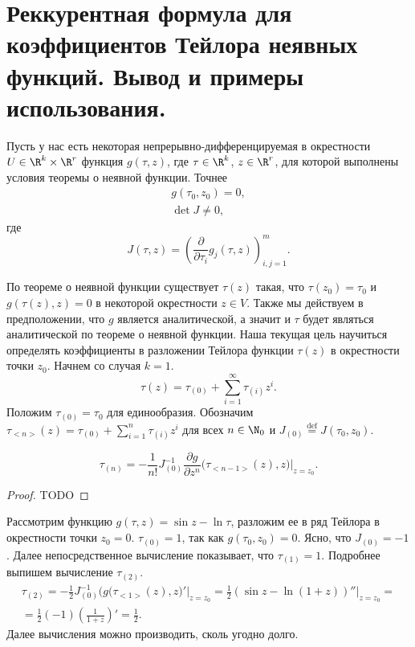 \section{Реккурентная формула для коэффициентов Тейлора неявных функций. Вывод и примеры использования.}

Пусть у нас есть некоторая непрерывно-дифференцируемая в окрестности $U \in \R^k \times \R^r$ функция $g(\tau, z)$, где $\tau \in \R^k$, $z \in \R^r$, для
которой выполнены условия теоремы о неявной функции. Точнее
\begin{gather*}
    g(\tau_0, z_0) = 0, \\
    \det J \neq 0,
\end{gather*}
где 
$$J(\tau, z) = \left(\frac{\partial}{\partial \tau_i} g_j(\tau, z)\right)_{i, j = 1}^m.$$

По теореме о неявной функции существует $\tau(z)$ такая, что $\tau(z_0) = \tau_0$ и $g(\tau(z), z) = 0$ в некоторой окрестности $z \in V$.
Также мы действуем в предположении, что $g$ является аналитической, а значит и $\tau$ будет являться аналитической по теореме о неявной функции.
Наша текущая цель научиться определять коэффициенты в разложении Тейлора функции $\tau(z)$ в окрестности точки $z_0$.
Начнем со случая $k = 1$.
$$ \tau(z) = \tau_{(0)} + \sum_{i=1}^\infty \tau_{(i)} z^i.$$
Положим $\tau_{(0)} = \tau_0$ для единообразия.
Обозначим $\tau_{<n>}(z) = \tau_{(0)} + \sum_{i=1}^n \tau_{(i)} z^i$ для всех $n \in \N_0$ и
$J_{(0)} \overset{\mathrm{def}}{=} J(\tau_0, z_0)$.
\begin{thm}
    $$\tau_{(n)} = -\frac{1}{n!} J_{(0)}^{-1} \frac{\partial g}{\partial z^n}\big(\tau_{<n - 1>}(z), z\big) \bigg |_{z = z_0}.$$
\end{thm}

\begin{proof}
TODO
\end{proof}

\begin{ex}
    Рассмотрим функцию $g(\tau, z) = \sin z - \ln \tau$, разложим ее в ряд Тейлора в окрестности точки $z_0 = 0$.
    $\tau_{(0)} = 1$, так как $g(\tau_0, z_0) = 0$.
    Ясно, что $J_{(0)} = -1$.
    Далее непосредственное вычисление показывает, что $\tau_{(1)} = 1$.
    Подробнее выпишем вычисление $\tau_{(2)}$.
    \begin{gather*}
        \tau_{(2)} = -\frac{1}{2} J_{(0)}^{-1} \big(g(\tau_{<1>}(z), z\big)' \big |_{z = z_0} = \frac{1}{2} (\sin z - \ln(1 + z))'' \big |_{z = z_0} = \\
        = \frac{1}{2} (-1) \left(\frac{1}{1 + z}\right)' = \frac{1}{2}.
    \end{gather*}
    Далее вычисления можно производить, сколь угодно долго.
\end{ex}


